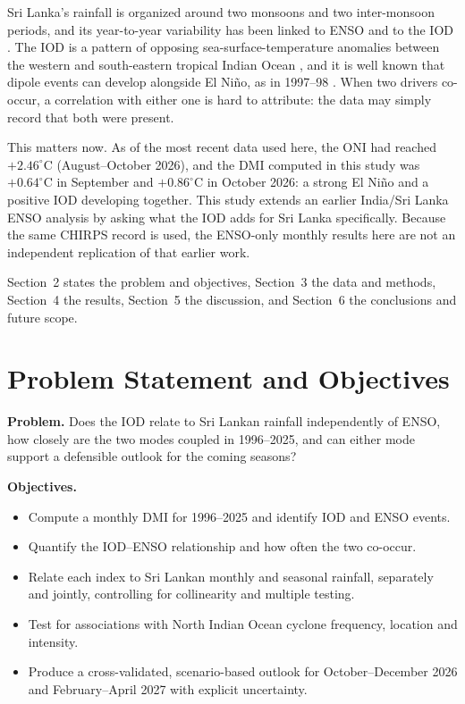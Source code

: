 \documentclass{article}
\begin{document}
Sri Lanka's rainfall is organized around two monsoons and two inter-monsoon periods, and its
year-to-year variability has been linked to ENSO \cite{zubair2006,zubair2008,malmgren2003} and to the
IOD \cite{zubair2003,kajakokulan2025}. The IOD is a pattern of opposing sea-surface-temperature
anomalies between the western and south-eastern tropical Indian Ocean \cite{saji1999}, and it is well
known that dipole events can develop alongside El Ni\~{n}o, as in 1997--98 \cite{saji1999,webster1999}.
When two drivers co-occur, a correlation with either one is hard to attribute: the data may
simply record that both were present.

This matters now. As of the most recent data used here, the ONI had reached $+2.46^{\circ}$C
(August--October 2026), and the DMI computed in this study was $+0.64^{\circ}$C in September and
$+0.86^{\circ}$C in October 2026: a strong El Ni\~{n}o and a positive IOD developing together.
This study extends an earlier India/Sri Lanka ENSO analysis by asking what the IOD adds for
Sri Lanka specifically. Because the same CHIRPS record is used, the ENSO-only monthly results here
are not an independent replication of that earlier work.

Section~2 states the problem and objectives, Section~3 the data and methods, Section~4 the results,
Section~5 the discussion, and Section~6 the conclusions and future scope.

\section{Problem Statement and Objectives}

\textbf{Problem.} Does the IOD relate to Sri Lankan rainfall independently of ENSO, how closely are
the two modes coupled in 1996--2025, and can either mode support a defensible outlook for the
coming seasons?

\textbf{Objectives.}
\begin{itemize}[noitemsep]
    \item Compute a monthly DMI for 1996--2025 and identify IOD and ENSO events.
    \item Quantify the IOD--ENSO relationship and how often the two co-occur.
    \item Relate each index to Sri Lankan monthly and seasonal rainfall, separately and jointly,
    controlling for collinearity and multiple testing.
    \item Test for associations with North Indian Ocean cyclone frequency, location and intensity.
    \item Produce a cross-validated, scenario-based outlook for October--December 2026 and
    February--April 2027 with explicit uncertainty.
\end{itemize}
\end{document}
